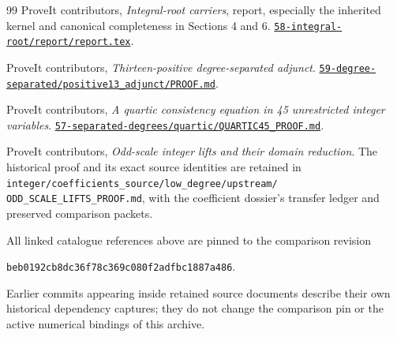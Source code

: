 \documentclass[11pt,a4paper]{article}
\theoremstyle{definition}
\theoremstyle{remark}
\newcommand{\snapshot}{\texttt{beb0192cb8dc36f78c369c080f2adfbc1887a486}}
\begin{document}
\begin{thebibliography}{99}
ProveIt contributors,
\emph{Integral-root carriers}, report, especially the inherited kernel
and canonical completeness in Sections 4 and 6.
\href{https://github.com/VladimirReshetnikov/ProveIt/blob/beb0192cb8dc36f78c369c080f2adfbc1887a486/Computability/DiophantineConsistency/con-zfc-diophantine-forms/58-integral-root/report/report.tex}
{\texttt{58-integral-root/report/report.tex}}.

ProveIt contributors,
\emph{Thirteen-positive degree-separated adjunct}.
\href{https://github.com/VladimirReshetnikov/ProveIt/blob/beb0192cb8dc36f78c369c080f2adfbc1887a486/Computability/DiophantineConsistency/con-zfc-diophantine-forms/59-degree-separated/positive13_adjunct/PROOF.md}
{\texttt{59-degree-separated/positive13\_adjunct/PROOF.md}}.

ProveIt contributors,
\emph{A quartic consistency equation in 45 unrestricted integer variables}.
\href{https://github.com/VladimirReshetnikov/ProveIt/blob/beb0192cb8dc36f78c369c080f2adfbc1887a486/Computability/DiophantineConsistency/con-zfc-diophantine-forms/57-separated-degrees/quartic/QUARTIC45_PROOF.md}
{\texttt{57-separated-degrees/quartic/QUARTIC45\_PROOF.md}}.

ProveIt contributors,
\emph{Odd-scale integer lifts and their domain reduction}.
The historical proof and its exact source identities are retained in
\texttt{integer/coefficients\_source/low\_degree/upstream/}
\texttt{ODD\_SCALE\_LIFTS\_PROOF.md}, with the coefficient dossier's
transfer ledger and preserved comparison packets.
\end{thebibliography}

\bigskip
\footnotesize
All linked catalogue references above are pinned to the comparison
revision
\begin{center}\snapshot.\end{center}
Earlier commits appearing inside retained source
documents describe their own historical dependency captures; they do
not change the comparison pin or the active numerical bindings of this
archive.
\end{document}
